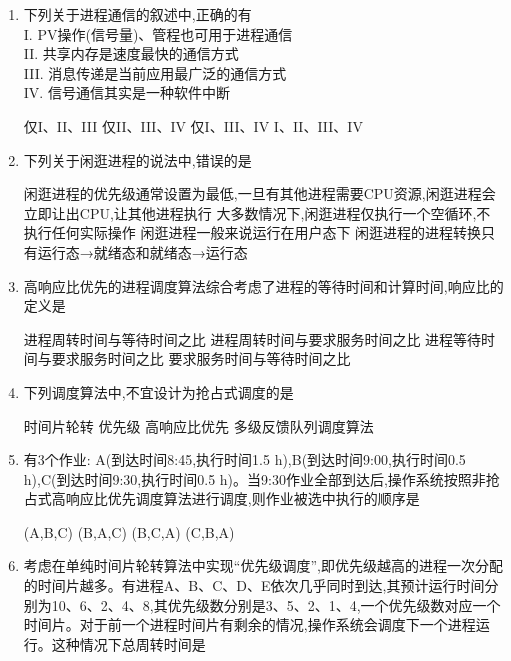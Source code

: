 \documentclass[12pt, a4paper, oneside, UTF8]{ctexbook}
\begin{document}
\begin{enumerate}
    \item 下列关于进程通信的叙述中,正确的有\\
    I. PV操作(信号量)、管程也可用于进程通信\\
    II. 共享内存是速度最快的通信方式\\
    III. 消息传递是当前应用最广泛的通信方式\\
    IV. 信号通信其实是一种软件中断
    \begin{choices}[2]
    \task 仅I、II、III
    \task 仅II、III、IV
    \task 仅I、III、IV
    \task I、II、III、IV
    \end{choices}


    \item 下列关于闲逛进程的说法中,错误的是
    \begin{choices}[1]
    \task 闲逛进程的优先级通常设置为最低,一旦有其他进程需要CPU资源,闲逛进程会立即让出CPU,让其他进程执行
    \task 大多数情况下,闲逛进程仅执行一个空循环,不执行任何实际操作
    \task 闲逛进程一般来说运行在用户态下
    \task 闲逛进程的进程转换只有运行态→就绪态和就绪态→运行态
    \end{choices}


    \item 高响应比优先的进程调度算法综合考虑了进程的等待时间和计算时间,响应比的定义是
    \begin{choices}[1]
    \task 进程周转时间与等待时间之比
    \task 进程周转时间与要求服务时间之比
    \task 进程等待时间与要求服务时间之比
    \task 要求服务时间与等待时间之比
    \end{choices}

    \item 下列调度算法中,不宜设计为抢占式调度的是
    \begin{choices}[1]
    \task 时间片轮转
    \task 优先级
    \task 高响应比优先
    \task 多级反馈队列调度算法
    \end{choices}

    \item 有3个作业: A(到达时间8:45,执行时间1.5 h),B(到达时间9:00,执行时间0.5 h),C(到达时间9:30,执行时间0.5 h)。当9:30作业全部到达后,操作系统按照非抢占式高响应比优先调度算法进行调度,则作业被选中执行的顺序是
    \begin{choices}[2]
    \task (A,B,C)
    \task (B,A,C)
    \task (B,C,A)
    \task (C,B,A)
    \end{choices}

    \item 考虑在单纯时间片轮转算法中实现“优先级调度”,即优先级越高的进程一次分配的时间片越多。有进程A、B、C、D、E依次几乎同时到达,其预计运行时间分别为10、6、2、4、8,其优先级数分别是3、5、2、1、4,一个优先级数对应一个时间片。对于前一个进程时间片有剩余的情况,操作系统会调度下一个进程运行。这种情况下总周转时间是
    \begin{choices}
    \end{choices}


\end{enumerate}
\end{document}
